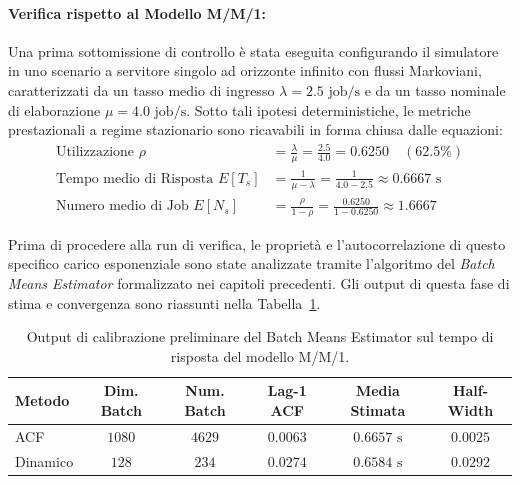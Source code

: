 ﻿\documentclass[a4paper,12pt]{article}
\begin{document}
\paragraph{Verifica rispetto al Modello M/M/1:}
Una prima sottomissione di controllo è stata eseguita configurando il simulatore in uno scenario a servitore singolo ad orizzonte infinito con flussi Markoviani, caratterizzati da un tasso medio di ingresso $\lambda = 2.5\text{ job/s}$ e da un tasso nominale di elaborazione $\mu = 4.0\text{ job/s}$. Sotto tali ipotesi deterministiche, le metriche prestazionali a regime stazionario sono ricavabili in forma chiusa dalle equazioni:
\begin{align}
    \text{Utilizzazione } \rho &= \frac{\lambda}{\mu} = \frac{2.5}{4.0} = 0.6250 \quad (62.5\%) \\
    \text{Tempo medio di Risposta } E[T_s] &= \frac{1}{\mu - \lambda} = \frac{1}{4.0 - 2.5} \approx 0.6667\text{ s} \\
    \text{Numero medio di Job } E[N_s] &= \frac{\rho}{1 - \rho} = \frac{0.6250}{1 - 0.6250} \approx 1.6667
\end{align}

Prima di procedere alla run di verifica, le proprietà e l'autocorrelazione di questo specifico carico esponenziale sono state analizzate tramite l'algoritmo del \textit{Batch Means Estimator} formalizzato nei capitoli precedenti. Gli output di questa fase di stima e convergenza sono riassunti nella Tabella~\ref{tab:batch_means_exp_calibration}.

\begin{table}[htbp]
    \centering
    \small
    \renewcommand{\arraystretch}{1.3}
    \begin{tabular}{lccccc}
        \hline
        \textbf{Metodo} & \textbf{Dim. Batch} & \textbf{Num. Batch} & \textbf{Lag-1 ACF} & \textbf{Media Stimata} & \textbf{Half-Width}     \\ \hline
        ACF             & $1080$                    & $4629$                    & $0.0063$           & $0.6657\text{ s}$      & $0.0025$    \\
        Dinamico        & $128$                     & $234$                     & $0.0274$           & $0.6584\text{ s}$      & $0.0292$    \\ \hline
    \end{tabular}
    \caption{Output di calibrazione preliminare del Batch Means Estimator sul tempo di risposta del modello M/M/1.}
    \label{tab:batch_means_exp_calibration}
\end{table}
\end{document}
